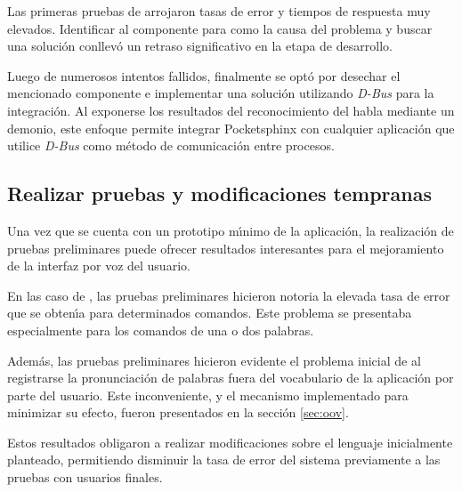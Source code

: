 Las primeras pruebas de  arrojaron tasas de error y tiempos de
respuesta muy elevados. Identificar al componente para  como la causa del problema
y buscar una soluci\'on conllev\'o un retraso significativo en la etapa de \mbox{desarrollo.}

Luego de numerosos intentos fallidos, finalmente se opt\'o por desechar el mencionado componente
e implementar una soluci\'on utilizando \emph{D-Bus} para la integraci\'on. Al exponerse los
resultados del reconocimiento del habla mediante un demonio, este enfoque permite integrar
Pocketsphinx con cualquier aplicaci\'on que utilice \emph{D-Bus} como m\'etodo de comunicaci\'on
entre procesos.

\subsection{Realizar pruebas y modificaciones tempranas}
Una vez que se cuenta con un prototipo m{\'\i}nimo de la aplicaci\'on, la realizaci\'on de pruebas preliminares
puede ofrecer resultados interesantes para el mejoramiento de la 
interfaz por voz del usuario.

En las caso de , las pruebas preliminares hicieron notoria la elevada tasa
de error que se obten{\'\i}a para determinados comandos. Este problema se presentaba especialmente para
los comandos de una o dos palabras.

Adem\'as, las pruebas preliminares hicieron evidente el problema inicial de 
al registrarse la pronunciaci\'on de palabras fuera del vocabulario de la aplicaci\'on por parte del usuario.
Este inconveniente, y el mecanismo implementado para minimizar su efecto, fueron presentados en la 
secci\'on \ref{sec:oov}. 

Estos resultados obligaron a realizar modificaciones sobre el lenguaje inicialmente planteado,
permitiendo disminuir la tasa de error del sistema previamente a las pruebas con usuarios
finales.